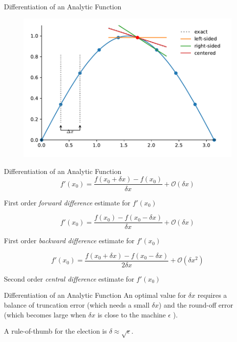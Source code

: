 \documentclass[11pt]{beamer}
\begin{document}
\begin{frame}[fragile]{Differentiation of an Analytic Function}
\begin{figure}
\includegraphics[scale=0.6]{derivatives.pdf}
\end{figure}
\end{frame}

\begin{frame}[fragile]{Differentiation of an Analytic Function}
\begin{equation}
f'(x_0) = \frac{f(x_0 + \delta x) - f(x_0)}{\delta x} + \mathcal{O} (\delta x)
\end{equation}
\begin{center}
First order \textit{forward difference} estimate for $f'(x_0)$
\end{center} 

\begin{equation}
f'(x_0) = \frac{f(x_0) - f(x_0 - \delta x)}{\delta x} + \mathcal{O} (\delta x)
\end{equation}
\begin{center}
First order \textit{backward difference} estimate for $f'(x_0)$
\end{center} 

\begin{equation}
f'(x_0) = \frac{f(x_0 + \delta x) - f(x_0 - \delta x)}{2\delta x} + \mathcal{O} (\delta x^2) \label{eq:secondOrder}
\end{equation}
\begin{center}
Second order \textit{central difference} estimate for $f'(x_0)$
\end{center} 
\end{frame}

\begin{frame}[fragile]{Differentiation of an Analytic Function}
An optimal value for $\delta x$ requires a balance of truncation error (which needs a small $\delta x$) and the round-off error (which becomes large when $\delta x$ is close to the machine $\epsilon$ ).\\
\bigskip

\pause
A rule-of-thumb for the election is $\delta \approx \sqrt{\epsilon}$.
\end{frame}
\end{document}
